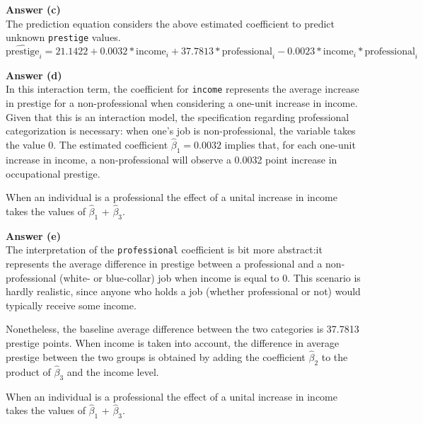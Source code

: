 \documentclass[12pt,letterpaper]{article}
\begin{document}
\vspace{0.5cm}
\noindent\textbf{Answer (c)}\\

\vspace{0.5cm}
\noindent The prediction equation considers the above estimated coefficient to predict unknown \texttt{prestige} values.
\[
\widehat{\text{prestige}}_i = 21.1422 + 0.0032 * {\text{income}}_i + 37.7813 * \text{professional}_i - 0.0023 * {\text{income}}_i * \text{professional}_i
\]

\vspace{0.5cm}
\noindent\textbf{Answer (d)}\\

\vspace{0.5cm}
\noindent In this interaction term, the coefficient for \texttt{income} represents the average increase in prestige for a non-professional when considering a one-unit increase in income. Given that this is an interaction model, the specification regarding professional categorization is necessary: when one's job is non-professional, the variable takes the value 0. The estimated coefficient $\hat{\beta}_1 = 0.0032$ implies that, for each one-unit increase in income, a non-professional will observe a 0.0032 point increase in occupational prestige.

\noindent When an individual is a professional the effect of a unital increase in income takes the values of $\hat{\beta}_1$ + $\hat{\beta}_3$.

\vspace{0.5cm}
\noindent\textbf{Answer (e)}\\

\vspace{0.5cm}
\noindent The interpretation of the \texttt{professional} coefficient is bit more abstract:it represents the average difference in prestige between a professional and a non-professional (white- or blue-collar) job when income is equal to 0. This scenario is hardly realistic, since anyone who holds a job (whether professional or not) would typically receive some income.

\noindent Nonetheless, the baseline average difference between the two categories is 37.7813 prestige points. When income is taken into account, the difference in average prestige between the two groups is obtained by adding the coefficient $\hat{\beta}_2$ to the product of $\hat{\beta}_3$ and the income level.

\noindent When an individual is a professional the effect of a unital increase in income takes the values of $\hat{\beta}_1$ + $\hat{\beta}_3$.
\end{document}
